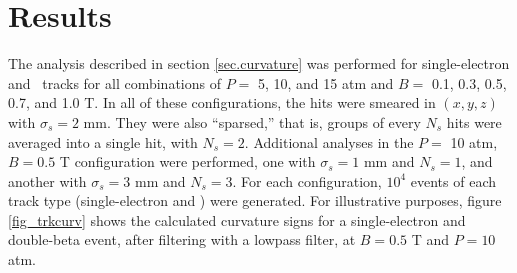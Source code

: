 \documentclass{JINST}
\begin{document}
\section{Results}\label{sec.results}
The analysis described in section \ref{sec.curvature} was performed for single-electron and
\bbonu\ tracks for all combinations of $P =$ 5, 10, and 15 atm and $B =$ 0.1, 0.3, 0.5, 0.7, 
and 1.0 T.  In all of these configurations, the hits were smeared in $(x,y,z)$ with $\sigma_{s} = 2$ mm.  They were also ``sparsed,'' that is, groups of every $N_{s}$ hits were averaged into a single hit, with $N_{s} = 2$.  Additional analyses in the $P =$ 10 atm, $B = 0.5$ T configuration were performed, one with $\sigma_{s} = 1$ mm and $N_{s} = 1$, and another with $\sigma_{s} = 3$ mm and $N_{s} = 3$.  For each configuration, $10^4$ events of each track type (single-electron and \bbonu) were generated. 
For illustrative purposes, figure \ref{fig_trkcurv} shows the calculated curvature signs for a single-electron and double-beta event, after filtering with a lowpass filter, at $B = 0.5$ T and $P = 10$ atm.  
\end{document}
